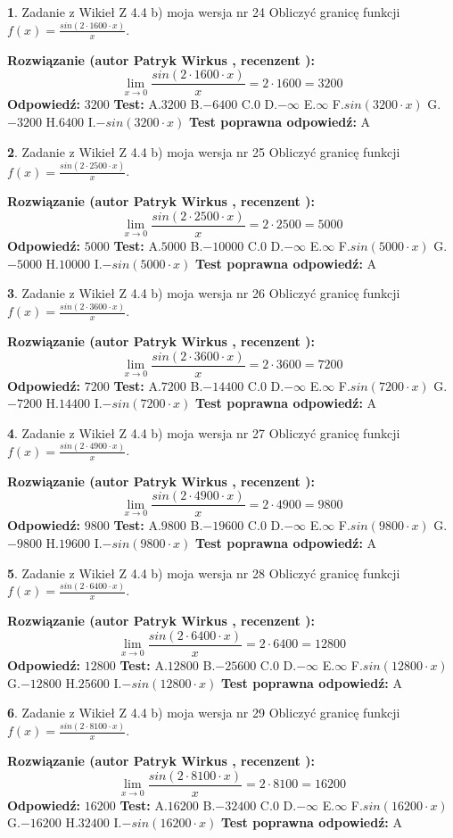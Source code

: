 \documentclass[12pt, a4paper]{article}
\theoremstyle{definition} %
\newtheorem{zad}{}
\newcommand{\zadStart}[1]{\begin{zad}#1\newline}
\newcommand{\zadStop}{\end{zad}}
\newcommand{\rozwStart}[2]{\noindent \textbf{Rozwiązanie (autor #1 , recenzent #2): }\newline}
\newcommand{\rozwStop}{\newline}
\newcommand{\odpStart}{\noindent \textbf{Odpowiedź:}\newline}
\newcommand{\odpStop}{\newline}
\newcommand{\testStart}{\noindent \textbf{Test:}\newline}
\newcommand{\testStop}{\newline}
\newcommand{\kluczStart}{\noindent \textbf{Test poprawna odpowiedź:}\newline}
\newcommand{\kluczStop}{\newline}
\begin{document}
\zadStart{Zadanie z Wikieł Z 4.4 b) moja wersja nr 24}
Obliczyć granicę funkcji $f(x)=\frac{sin(2 \cdot1600\cdot x)}{x}$.
\zadStop
\rozwStart{Patryk Wirkus}{}
$$\lim\limits_{x\to 0}\frac{sin(2 \cdot 1600\cdot x)}{x}=
2 \cdot 1600 = 3200$$
\rozwStop
\odpStart
$3200$
\odpStop
\testStart
A.$3200$
B.$-6400$
C.$0$
D.$-\infty$
E.$\infty$
F.$sin(3200\cdot x)$
G.$-3200$
H.$6400$
I.$-sin(3200\cdot x)$
\testStop
\kluczStart
A
\kluczStop



\zadStart{Zadanie z Wikieł Z 4.4 b) moja wersja nr 25}
Obliczyć granicę funkcji $f(x)=\frac{sin(2 \cdot2500\cdot x)}{x}$.
\zadStop
\rozwStart{Patryk Wirkus}{}
$$\lim\limits_{x\to 0}\frac{sin(2 \cdot 2500\cdot x)}{x}=
2 \cdot 2500 = 5000$$
\rozwStop
\odpStart
$5000$
\odpStop
\testStart
A.$5000$
B.$-10000$
C.$0$
D.$-\infty$
E.$\infty$
F.$sin(5000\cdot x)$
G.$-5000$
H.$10000$
I.$-sin(5000\cdot x)$
\testStop
\kluczStart
A
\kluczStop



\zadStart{Zadanie z Wikieł Z 4.4 b) moja wersja nr 26}
Obliczyć granicę funkcji $f(x)=\frac{sin(2 \cdot3600\cdot x)}{x}$.
\zadStop
\rozwStart{Patryk Wirkus}{}
$$\lim\limits_{x\to 0}\frac{sin(2 \cdot 3600\cdot x)}{x}=
2 \cdot 3600 = 7200$$
\rozwStop
\odpStart
$7200$
\odpStop
\testStart
A.$7200$
B.$-14400$
C.$0$
D.$-\infty$
E.$\infty$
F.$sin(7200\cdot x)$
G.$-7200$
H.$14400$
I.$-sin(7200\cdot x)$
\testStop
\kluczStart
A
\kluczStop



\zadStart{Zadanie z Wikieł Z 4.4 b) moja wersja nr 27}
Obliczyć granicę funkcji $f(x)=\frac{sin(2 \cdot4900\cdot x)}{x}$.
\zadStop
\rozwStart{Patryk Wirkus}{}
$$\lim\limits_{x\to 0}\frac{sin(2 \cdot 4900\cdot x)}{x}=
2 \cdot 4900 = 9800$$
\rozwStop
\odpStart
$9800$
\odpStop
\testStart
A.$9800$
B.$-19600$
C.$0$
D.$-\infty$
E.$\infty$
F.$sin(9800\cdot x)$
G.$-9800$
H.$19600$
I.$-sin(9800\cdot x)$
\testStop
\kluczStart
A
\kluczStop



\zadStart{Zadanie z Wikieł Z 4.4 b) moja wersja nr 28}
Obliczyć granicę funkcji $f(x)=\frac{sin(2 \cdot6400\cdot x)}{x}$.
\zadStop
\rozwStart{Patryk Wirkus}{}
$$\lim\limits_{x\to 0}\frac{sin(2 \cdot 6400\cdot x)}{x}=
2 \cdot 6400 = 12800$$
\rozwStop
\odpStart
$12800$
\odpStop
\testStart
A.$12800$
B.$-25600$
C.$0$
D.$-\infty$
E.$\infty$
F.$sin(12800\cdot x)$
G.$-12800$
H.$25600$
I.$-sin(12800\cdot x)$
\testStop
\kluczStart
A
\kluczStop



\zadStart{Zadanie z Wikieł Z 4.4 b) moja wersja nr 29}
Obliczyć granicę funkcji $f(x)=\frac{sin(2 \cdot8100\cdot x)}{x}$.
\zadStop
\rozwStart{Patryk Wirkus}{}
$$\lim\limits_{x\to 0}\frac{sin(2 \cdot 8100\cdot x)}{x}=
2 \cdot 8100 = 16200$$
\rozwStop
\odpStart
$16200$
\odpStop
\testStart
A.$16200$
B.$-32400$
C.$0$
D.$-\infty$
E.$\infty$
F.$sin(16200\cdot x)$
G.$-16200$
H.$32400$
I.$-sin(16200\cdot x)$
\testStop
\kluczStart
A
\kluczStop
\end{document}
